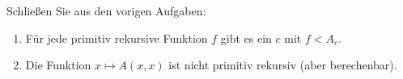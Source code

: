 
\begin{exercise}[211]

Schließen Sie aus den vorigen Aufgaben:
\begin{enumerate}[label = \alph*.]
  \item Für jede primitiv rekursive Funktion $f$ gibt es ein $c$ mit $f < A_c$.
  \item Die Funktion $x \mapsto A(x,x)$ ist nicht primitiv rekursiv (aber berechenbar).
\end{enumerate}

\end{exercise}


\begin{solution}

\phantom{}

\end{solution}
